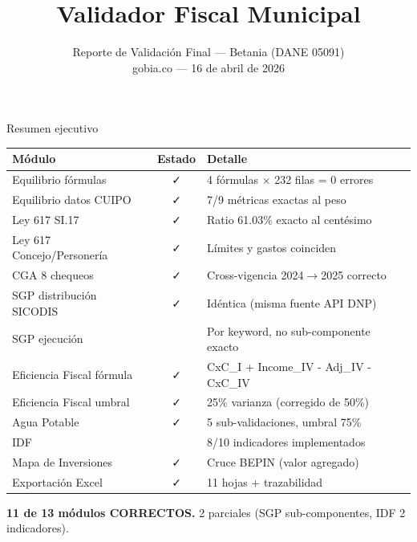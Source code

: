 \documentclass[aspectratio=169,11pt]{beamer}
\title{Validador Fiscal Municipal}
\subtitle{Reporte de Validaci\'on Final --- Betania (DANE 05091)\\[4pt]
\small\textcolor{sepia}{gobia.co --- 16 de abril de 2026}}
\author{}
\date{}
\newcommand{\cmark}{\textcolor{verde}{\faCheck}}
\newcommand{\wmark}{\textcolor{amber}{\faExclamationTriangle}}
\begin{document}
\begin{frame}
\titlepage
\end{frame}

\begin{frame}{Resumen ejecutivo}
\footnotesize
\begin{center}
\renewcommand{\arraystretch}{1.2}
\begin{tabular}{l c l}
\toprule
\textbf{M\'odulo} & \textbf{Estado} & \textbf{Detalle} \\
\midrule
Equilibrio f\'ormulas & \cmark & 4 f\'ormulas $\times$ 232 filas = 0 errores \\
Equilibrio datos CUIPO & \cmark & 7/9 m\'etricas exactas al peso \\
Ley 617 SI.17 & \cmark & Ratio 61.03\% exacto al cent\'esimo \\
Ley 617 Concejo/Personer\'ia & \cmark & L\'imites y gastos coinciden \\
CGA 8 chequeos & \cmark & Cross-vigencia 2024$\to$2025 correcto \\
SGP distribuci\'on SICODIS & \cmark & Id\'entica (misma fuente API DNP) \\
SGP ejecuci\'on & \wmark & Por keyword, no sub-componente exacto \\
Eficiencia Fiscal f\'ormula & \cmark & CxC\_I + Income\_IV - Adj\_IV - CxC\_IV \\
Eficiencia Fiscal umbral & \cmark & 25\% varianza (corregido de 50\%) \\
Agua Potable & \cmark & 5 sub-validaciones, umbral 75\% \\
IDF & \wmark & 8/10 indicadores implementados \\
Mapa de Inversiones & \cmark & Cruce BEPIN (valor agregado) \\
Exportaci\'on Excel & \cmark & 11 hojas + trazabilidad \\
\bottomrule
\end{tabular}
\end{center}
\vspace{6pt}
\centering
\textbf{11 de 13 m\'odulos CORRECTOS.} 2 parciales (SGP sub-componentes, IDF 2 indicadores).
\end{frame}
\end{document}
